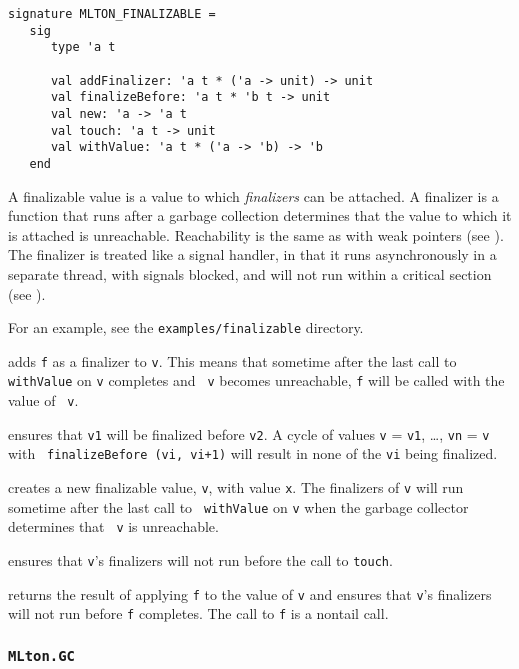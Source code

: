 
\begin{verbatim}
signature MLTON_FINALIZABLE =
   sig
      type 'a t

      val addFinalizer: 'a t * ('a -> unit) -> unit
      val finalizeBefore: 'a t * 'b t -> unit
      val new: 'a -> 'a t
      val touch: 'a t -> unit
      val withValue: 'a t * ('a -> 'b) -> 'b
   end
\end{verbatim}

A finalizable value is a value to which {\em finalizers} can be
attached.  A finalizer is a function that runs after a garbage
collection determines that the value to which it is attached is
unreachable.  Reachability is the same as with weak pointers (see
).  The finalizer is treated like a signal handler, in
that it runs asynchronously in a separate thread, with signals
blocked, and will not run within a critical section (see
).

For an example, see the {\tt examples/finalizable} directory.

\begin{description}

adds {\tt f} as a finalizer to {\tt v}.  This means that sometime
after the last call to {\tt withValue} on {\tt v} completes and {\tt
v} becomes unreachable, {\tt f} will be called with the value of {\tt
v}.

ensures that {\tt v1} will be finalized before {\tt v2}.  A cycle of
values {\tt v} = {\tt v1}, \ldots, {\tt vn} = {\tt v} with {\tt
finalizeBefore (vi, vi+1)} will result in none of the {\tt vi} being
finalized.

creates a new finalizable value, {\tt v}, with value {\tt x}.  The
finalizers of {\tt v} will run sometime after the last call to {\tt
withValue} on {\tt v} when the garbage collector determines that {\tt
v} is unreachable.

ensures that {\tt v}'s finalizers will not run before the call to
{\tt touch}.

returns the result of applying {\tt f} to the value of {\tt v} and
ensures that {\tt v}'s finalizers will not run before {\tt f}
completes.  The call to {\tt f} is a nontail call.

\end{description}

\subsubsection{{\tt MLton.GC}}

